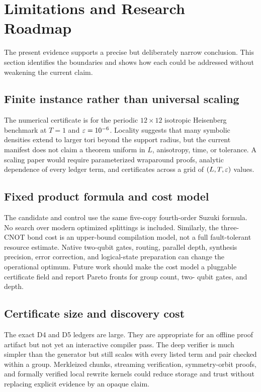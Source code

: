 \section{Limitations and Research Roadmap}
\label{sec:limitations}

The present evidence supports a precise but deliberately narrow conclusion.
This section identifies the boundaries and shows how each could be addressed
without weakening the current claim.

\subsection{Finite instance rather than universal scaling}

The numerical certificate is for the periodic $12\times12$ isotropic
Heisenberg benchmark at $T=1$ and $\varepsilon=10^{-6}$.  Locality suggests that many
symbolic densities extend to larger tori beyond the support radius, but the
current manifest does not claim a theorem uniform in $L$, anisotropy, time, or
tolerance.  A scaling paper would require parameterized wraparound proofs,
analytic dependence of every ledger term, and certificates across a grid of
$(L,T,\varepsilon)$ values.

\subsection{Fixed product formula and cost model}

The candidate and control use the same five-copy fourth-order Suzuki formula.
No search over modern optimized splittings is included.  Similarly, the
three-CNOT bond cost is an upper-bound compilation model, not a full
fault-tolerant resource estimate.  Native two-qubit gates, routing, parallel
depth, synthesis precision, error correction, and logical-state preparation
can change the operational optimum.  Future work should make the cost model a
pluggable certificate field and report Pareto fronts for group count, two-
qubit gates, and depth.

\subsection{Certificate size and discovery cost}

The exact D4 and D5 ledgers are large.  They are appropriate for an offline
proof artifact but not yet an interactive compiler pass.  The deep verifier is
much simpler than the generator but still scales with every listed term and
pair checked within a group.  Merkleized chunks, streaming verification,
symmetry-orbit proofs, and formally verified local rewrite kernels could
reduce storage and trust without replacing explicit evidence by an opaque
claim.

